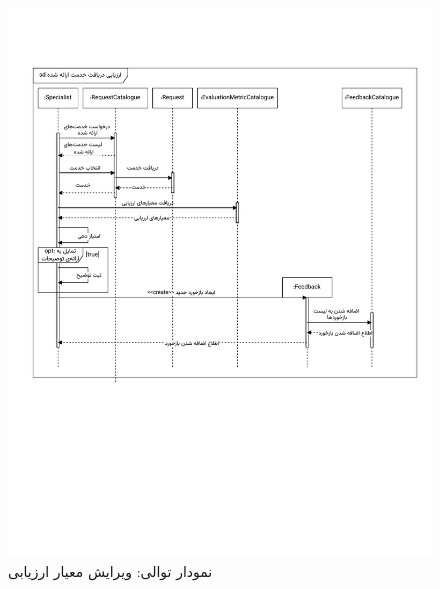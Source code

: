 \begin{figure}[ht!]
	\centering
	\includegraphics[scale=0.8, page=4]{figs/OOD-Sequence-3.pdf}
	\caption{نمودار توالی: ویرایش معیار ارزیابی}
\end{figure}
\FloatBarrier
\newpage

